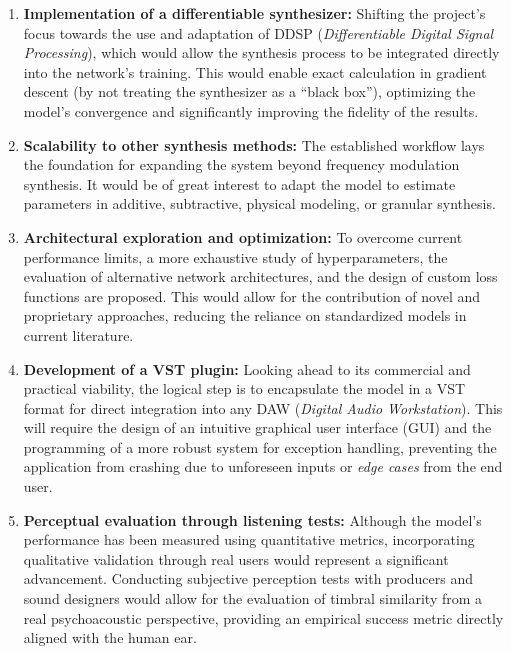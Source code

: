 \begin{enumerate}
\item \textbf{Implementation of a differentiable synthesizer:} Shifting the project's focus towards the use and adaptation of DDSP (\textit{Differentiable Digital Signal Processing}), which would allow the synthesis process to be integrated directly into the network's training. This would enable exact calculation in gradient descent (by not treating the synthesizer as a ``black box''), optimizing the model's convergence and significantly improving the fidelity of the results.

\item \textbf{Scalability to other synthesis methods:} The established workflow lays the foundation for expanding the system beyond frequency modulation synthesis. It would be of great interest to adapt the model to estimate parameters in additive, subtractive, physical modeling, or granular synthesis.

\item \textbf{Architectural exploration and optimization:} To overcome current performance limits, a more exhaustive study of hyperparameters, the evaluation of alternative network architectures, and the design of custom loss functions are proposed. This would allow for the contribution of novel and proprietary approaches, reducing the reliance on standardized models in current literature.

\item \textbf{Development of a VST plugin:} Looking ahead to its commercial and practical viability, the logical step is to encapsulate the model in a VST format for direct integration into any DAW (\textit{Digital Audio Workstation}). This will require the design of an intuitive graphical user interface (GUI) and the programming of a more robust system for exception handling, preventing the application from crashing due to unforeseen inputs or \textit{edge cases} from the end user.

\item \textbf{Perceptual evaluation through listening tests:} Although the model's performance has been measured using quantitative metrics, incorporating qualitative validation through real users would represent a significant advancement. Conducting subjective perception tests with producers and sound designers would allow for the evaluation of timbral similarity from a real psychoacoustic perspective, providing an empirical success metric directly aligned with the human ear.
\end{enumerate}